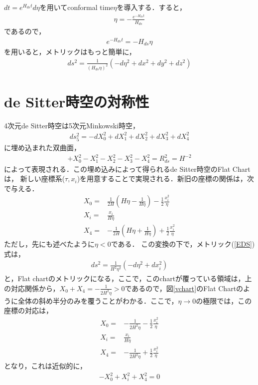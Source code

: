 $dt=e^{H_{ds}t}d\eta$を用いてconformal time$\eta$を導入する．すると，
\begin{align}
\eta=-\frac{e^{-H_{ds}t}}{H_{ds}}
\end{align}
であるので，
\begin{align}
e^{-H_{ds}t}=-H_{ds}\eta
\end{align}
を用いると，メトリックはもっと簡単に，
\begin{align}
ds^2=\frac{1}{(H_{ds}\eta)^2}(-d\eta^2+dx^2+dy^2+dz^2)
\end{align}

\section{de Sitter時空の対称性}
4次元de Sitter時空は5次元Minkowski時空，
\begin{align}
  \label{EDS}
  ds^2_{5}=-dX_0^2+dX^2_{1}+dX^2_{2}+dX^2_{3}+dX^2_{4}
\end{align}
に埋め込まれた双曲面，
\begin{align}
  +X_0^2-X_1^2-X_2^2-X_3^2-X_4^2=R_{ds}^2=H^{-2}
\end{align}
によって表現される．この埋め込みによって得られるde Sitter時空のFlat Chartは，
新しい座標系($\tau,x_{i}$)を用意することで実現される．新旧の座標の関係は，次で与える．
\begin{align}
  X_{0}=&\frac{1}{2H}(H\eta-\frac{1}{H\eta})-\frac{1}{2}\frac{x_i^2}{\eta}\\
  X_{i}=&\frac{x_i}{H\eta}\\
  X_{4}=&-\frac{1}{2H}(H\eta+\frac{1}{H\eta})+\frac{1}{2}\frac{x_i^2}{\eta}
\end{align}
ただし，先にも述べたように$\eta<0$である．
この変換の下で，メトリック(\ref{EDS})式は，
\begin{align}
  ds^{2}=\frac{1}{H^2\eta^2}(-d\eta^2+dx_{i}^2)
\end{align}
と，Flat chartのメトリックになる，ここで，このchartが覆っている領域は，上の対応関係から，$X_{0}+X_{4}=-\frac{1}{2H^2\eta}>0$であるので，図\ref{vchart}のFlat Chartのように全体の斜め半分のみを覆うことがわかる．ここで，$\eta\to 0$の極限では，この座標の対応は，
\begin{align}
  X_{0}=&-\frac{1}{2H^2\eta}-\frac{1}{2}\frac{x_i^2}{\eta}\\
  X_{i}=&\frac{x_i}{H\eta}\\
  X_{4}=&-\frac{1}{2H^2\eta}+\frac{1}{2}\frac{x_i^2}{\eta}
\end{align}
となり，これは近似的に，
\begin{align}
  -X_{0}^2+X_{i}^2+X_{4}^2=0
\end{align}
